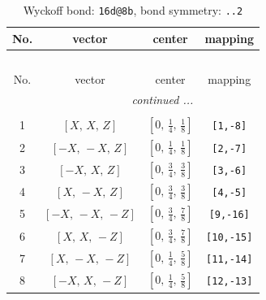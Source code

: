 \documentclass[fleqn,8pt]{jsarticle}
\begin{document}
\begin{longtable}{cccc}
\caption{Wyckoff bond: {\tt 16d@8b}, bond symmetry: {\tt ..2}}
 \\
 \hline \hline
No. & vector & center & mapping \\ \hline \endfirsthead

\multicolumn{3}{l}{\tablename\ \thetable{}} \\
 \hline \hline
No. & vector & center & mapping \\ \hline \endhead

 \hline \hline
\multicolumn{3}{r}{\footnotesize\it continued ...} \\ \endfoot

 \hline \hline
\multicolumn{3}{r}{} \\ \endlastfoot

1 & $\left[ X,\, X,\, Z \right]$ & $\left[ 0,\, \frac{1}{4},\, \frac{1}{8} \right]$ & {\tt [1,-8]} \\ \hline
2 & $\left[ - X,\, - X,\, Z \right]$ & $\left[ 0,\, \frac{1}{4},\, \frac{1}{8} \right]$ & {\tt [2,-7]} \\ \hline
3 & $\left[ - X,\, X,\, Z \right]$ & $\left[ 0,\, \frac{3}{4},\, \frac{3}{8} \right]$ & {\tt [3,-6]} \\ \hline
4 & $\left[ X,\, - X,\, Z \right]$ & $\left[ 0,\, \frac{3}{4},\, \frac{3}{8} \right]$ & {\tt [4,-5]} \\ \hline
5 & $\left[ - X,\, - X,\, - Z \right]$ & $\left[ 0,\, \frac{3}{4},\, \frac{7}{8} \right]$ & {\tt [9,-16]} \\ \hline
6 & $\left[ X,\, X,\, - Z \right]$ & $\left[ 0,\, \frac{3}{4},\, \frac{7}{8} \right]$ & {\tt [10,-15]} \\ \hline
7 & $\left[ X,\, - X,\, - Z \right]$ & $\left[ 0,\, \frac{1}{4},\, \frac{5}{8} \right]$ & {\tt [11,-14]} \\ \hline
8 & $\left[ - X,\, X,\, - Z \right]$ & $\left[ 0,\, \frac{1}{4},\, \frac{5}{8} \right]$ & {\tt [12,-13]} \\
\end{longtable}
\renewcommand{\arraystretch}{1.2}
\end{document}
